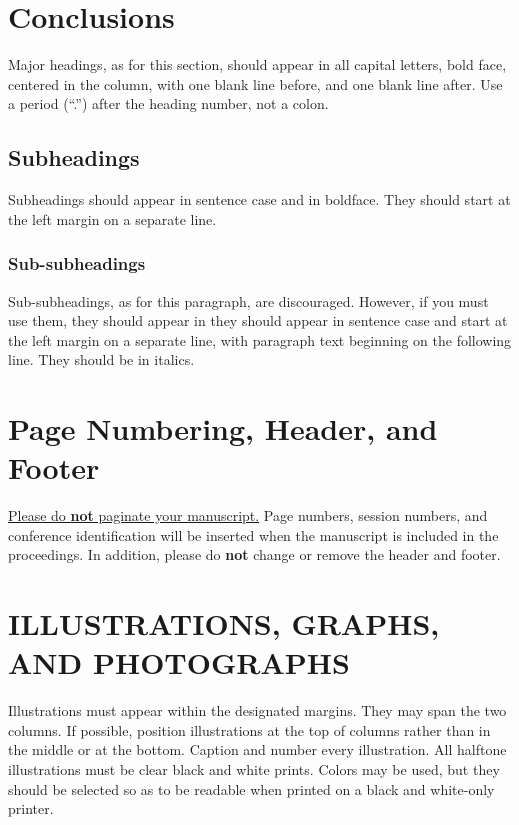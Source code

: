 \documentclass[a4paper,10pt,oneside]{article}
\begin{document}
\begin{sloppy}
\section{ Conclusions }
\label{sec:majhead}

Major headings, as for this section, should appear in all capital letters, bold face, centered in the column, with one blank line before, and one blank line after. Use a period (``.'') after the heading number, not a colon.

\subsection{Subheadings}
\label{ssec:subhead}

Subheadings should appear in sentence case and in boldface. They should start at the left margin on a separate line. 
 
\subsubsection{Sub-subheadings}
\label{sssec:subsubhead}

Sub-subheadings, as for this paragraph, are discouraged. However, if you must use them, they should appear in they should appear in sentence case and start at the left margin on a separate line, with paragraph text beginning on the following line. They should be in italics.  \\

\section{Page Numbering, Header, and Footer}
\label{sec:page}

\underline{Please do {\bf not} paginate your manuscript.} Page numbers, session numbers, and conference identification will be inserted when the manuscript is included in the proceedings. In addition, please do {\bf not} change or remove the header and footer.

\section{ILLUSTRATIONS, GRAPHS, AND PHOTOGRAPHS}
\label{sec:illust}

Illustrations must appear within the designated margins. They may span the two columns. If possible, position illustrations at the top of columns rather than in the middle or at the bottom. Caption and number every illustration. All halftone illustrations must be clear black and white prints. Colors may be used, but they should be selected so as to be readable when printed on a black and white-only printer.


\end{sloppy}
\end{document}
